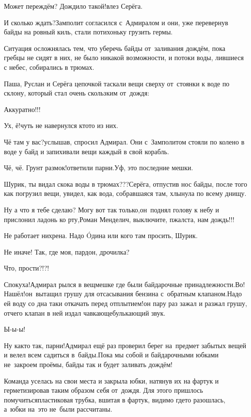 \diagdash Может переждём? Дождило такой!\mdash влез Серёга.

\diagdash И сколько ждать?\mdash Замполит согласился с~Адмиралом и они, уже перевернув байды на ровный киль, стали потихоньку грузить гермы. 

Ситуация осложнялась тем, что уберечь байды от~заливания дождём, пока гребцы не сидят в них, не было никакой возможности, и потоки воды, лившиеся с небес, собирались в трюмах.

Паша, Руслан и Серёга цепочкой таскали вещи сверху от~стоянки к воде по склону, который стал очень скользким от~дождя:

\diagdash Аккуратно!!!

\diagdash Ух, ё!\mdash чуть не навернулся кто\sdash то из них.

\diagdash Чё там у вас?\mdash услышав, спросил Адмирал. Они с~Замполитом стояли по колено в воде у байд и запихивали вещи каждый в свой корабль.

\diagdash Чё, чё. Грунт размок!\mdash ответили парни.\mdash Уф, это последние мешки.

\diagdash Шурик, ты видал скока воды в трюмах???\mdash Серёга, отпустив нос байды, после того как погрузил вещи, увидел, как вода, собравшаяся там, хлынула по всему днищу.

\diagdash Ну а что я тебе сделаю? Могу вот так только,\mdash он~поднял голову к небу и прислонил ладонь ко рту,\mdash Роман Менделич, выключите, п\sdash жалста, нам дождь!!!

\diagdash Не работает нихрена. Надо {\'{O}}дина или кого там просить, Шурик.

\diagdash Не иначе! Так, где моя, пардон, дрочилка?

\diagdash Что, прости?!?!

\diagdash Спокуха!\mdash Адмирал рылся в вещмешке где были байдарочные принадлежности.\mdash Во! Нашёл!\mdash он~вытащил грушу для отсасывания бензина с~обратным клапаном.\mdash Надо ей воду со дна таки откачать перед отплытием!\mdash он пару раз зажал и разжал грушу, отчего клапан в ней издал чавкающе\sdash булькающий звук.

\diagdash Ы-ы-ы! 

\diagdash Ну как\sdash то так, парни!\mdash Адмирал ещё раз проверил берег на~предмет забытых вещей и велел всем садиться в~байды.\mdash Пока мы собой и байдарочными юбками не~закроем проёмы, байды так и будет заливать дождём!

Команда уселась на свои места и закрыла юбки, натянув их на фартук и герметизировав таким образом себя от~дождя. Для этого пришлось помучиться\mdash пластиковая трубка, вшитая в фартук, видимо где\sdash то разошлась, а~юбки на~это не~были рассчитаны. 


